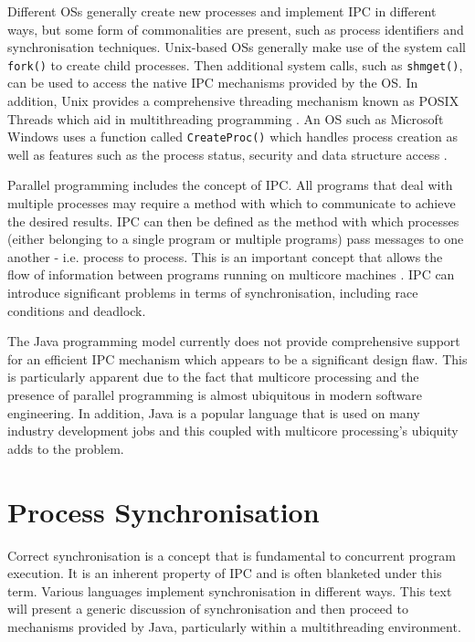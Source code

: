 \documentclass[12pt,a4paper,oneside]{article}
\def\code#1{\texttt{#1}}
\begin{document}
  Different OSs generally create new processes and implement IPC in different ways, but some form of commonalities are present, such as process identifiers and synchronisation techniques. Unix-based OSs generally make use of the system call \code{fork()} to create child processes. Then additional system calls, such as \code{shmget()}, can be used to access the native IPC mechanisms provided by the OS. In addition, Unix provides a comprehensive threading mechanism known as POSIX Threads which aid in multithreading programming \citep{linuxKernal}. An OS such as Microsoft Windows uses a function called \code{CreateProc()} which handles process creation as well as features such as the process status, security and data structure access \citep{modernOS}.

  Parallel programming includes the concept of IPC. All programs that deal with multiple processes may require a method with which to communicate to achieve the desired results. IPC can then be defined as the method with which processes (either belonging to a single program or multiple programs) pass messages to one another - i.e. process to process. This is an important concept that allows the flow of information between programs running on multicore machines \citep{modernOS}. IPC can introduce significant problems in terms of synchronisation, including race conditions and deadlock.

  The Java programming model currently does not provide comprehensive support for an efficient IPC mechanism which appears to be a significant design flaw. This is particularly apparent due to the fact that multicore processing and the presence of parallel programming is almost ubiquitous in modern software engineering. In addition, Java is a popular language that is used on many industry development jobs and this coupled with multicore processing's ubiquity adds to the problem.

\section{Process Synchronisation}

  Correct synchronisation is a concept that is fundamental to concurrent program execution. It is an inherent property of IPC and is often blanketed under this term. Various languages implement synchronisation in different ways. This text will present a generic discussion of synchronisation and then proceed to mechanisms provided by Java, particularly within a multithreading environment.
\end{document}
